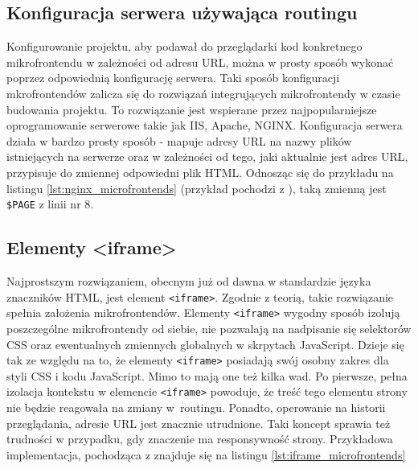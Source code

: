 \documentclass{SGGW-thesis}
\begin{document}
\subsection{Konfiguracja serwera używająca routingu}
Konfigurowanie projektu, aby podawał do przeglądarki kod konkretnego mikrofrontendu w zależności od adresu URL, można w prosty sposób wykonać poprzez odpowiednią konfigurację serwera. Taki sposób konfiguracji mkrofrontendów zalicza się do rozwiązań integrujących mikrofrontendy w czasie budowania projektu. To rozwiązanie jest wspierane przez najpopularniejsze oprogramowanie serwerowe takie jak IIS, Apache, NGINX. Konfiguracja serwera działa w bardzo prosty sposób - mapuje adresy URL na nazwy plików istniejących na serwerze oraz w zależności od tego, jaki aktualnie jest adres URL, przypisuje do zmiennej odpowiedni plik HTML. Odnosząc się do przykładu na listingu \cref{lst:nginx_microfrontends} (przykład pochodzi z \cite{fowler_2019}), taką zmienną jest \lstinline{$PAGE} z linii nr 8.



\subsection{Elementy <iframe>}
Najprostszym rozwiązaniem, obecnym już od dawna w standardzie języka znaczników HTML, jest element \lstinline{<iframe>}. Zgodnie z teorią, takie rozwiązanie spełnia założenia mikrofrontendów. Elementy \lstinline{<iframe>} wygodny sposób izolują poszczególne mikrofrontendy od siebie, nie pozwalają na nadpisanie się selektorów CSS oraz ewentualnych zmiennych globalnych w skrpytach JavaScript. Dzieje się tak ze względu na to, że elementy \lstinline{<iframe>} posiadają swój osobny zakres dla styli CSS i kodu JavaScript. Mimo to mają one też kilka wad. Po pierwsze, pełna izolacja kontekstu w elemencie \lstinline{<iframe>} powoduje, że treść tego elementu strony nie będzie reagowała na zmiany w~routingu. Ponadto, operowanie na historii przeglądania, adresie URL jest znacznie utrudnione. Taki koncept sprawia też trudności w przypadku, gdy znaczenie ma responsywność strony. Przykładowa implementacja, pochodząca z \cite{fowler_2019} znajduje się na listingu \cref{lst:iframe_microfrontends}


\end{document}
